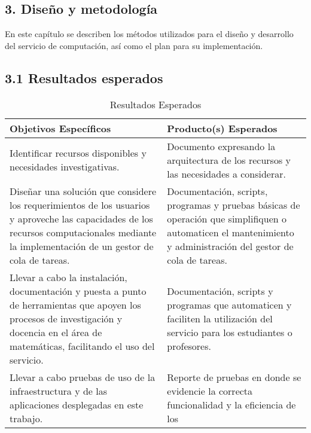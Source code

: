 \begin{spacing}{1.5}
  \begin{tightcenter}
    \section{3. Diseño y metodología}
    \mylinespacing
  \end{tightcenter}

  En este capítulo se describen los métodos utilizados para el diseño y
  desarrollo del servicio de computación, así como el plan para su
  implementación.

  \subsection{3.1 Resultados esperados}

  \begin{table}[h]
    \centering
    \begin{tabular}{p{7cm}|p{7cm}}
      \hline
      \textbf{Objetivos Específicos}                                 & \textbf{Producto(s) Esperados} \\
      \hline
      Identificar recursos disponibles y necesidades investigativas. &
      Documento expresando la arquitectura de los recursos y las necesidades a
      considerar.                                                                                     \\
      \hline
      Diseñar una solución que considere los requerimientos de los usuarios y
      aproveche las capacidades de los recursos computacionales mediante la
      implementación de un gestor de cola de tareas.                 & Documentación, scripts,
      programas y pruebas básicas de operación que simplifiquen o automaticen el
      mantenimiento y administración del gestor de cola de tareas.                                    \\
      \hline
      Llevar a cabo la instalación, documentación y puesta a punto de
      herramientas que apoyen los procesos de investigación y docencia en el área de
      matemáticas, facilitando el uso del servicio.                  & Documentación, scripts y
      programas que automaticen y faciliten la utilización del servicio para los
      estudiantes o profesores.                                                                       \\
      \hline
      Llevar a cabo pruebas de uso de la infraestructura y de las
      aplicaciones desplegadas en este trabajo.                      & Reporte de pruebas en donde se
      evidencie la correcta funcionalidad y la eficiencia de los                                      \\
      \hline
    \end{tabular}
    \caption{Resultados Esperados}
    \label{table:table2}
  \end{table}


\end{spacing}
